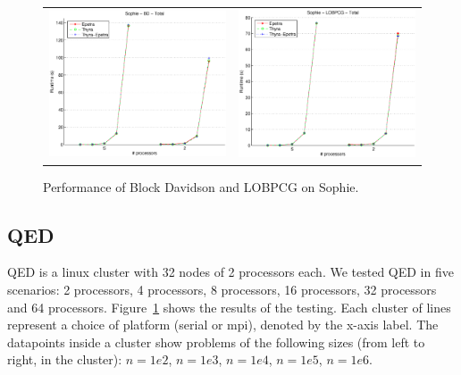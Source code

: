 \documentclass[10pt]{article}
\begin{document}
\begin{figure}[htp]
\begin{tabular}{cc}
\includegraphics[width=2.50in]{results/sophie/Sophie-BD-Total_ln.eps} &
\includegraphics[width=2.50in]{results/sophie/Sophie-LOBPCG-Total_ln.eps} 
\end{tabular}
\caption{Performance of Block Davidson and LOBPCG on Sophie.}
\label{fig:Sophie}
\end{figure}


\subsection{QED}

QED is a linux cluster with 32 nodes of 2 processors each. We tested QED in five
scenarios: 2 processors, 4 processors, 8 processors, 16 processors, 32
processors and 64 processors. Figure~\ref{fig:Sophie} shows the results of
the testing. Each cluster of lines represent a choice of platform (serial or mpi), denoted
by the x-axis label. The datapoints inside a cluster show problems of the following sizes
(from left to right, in the cluster): $n=1e2$, $n=1e3$, $n=1e4$, $n=1e5$, $n=1e6$.
\end{document}
